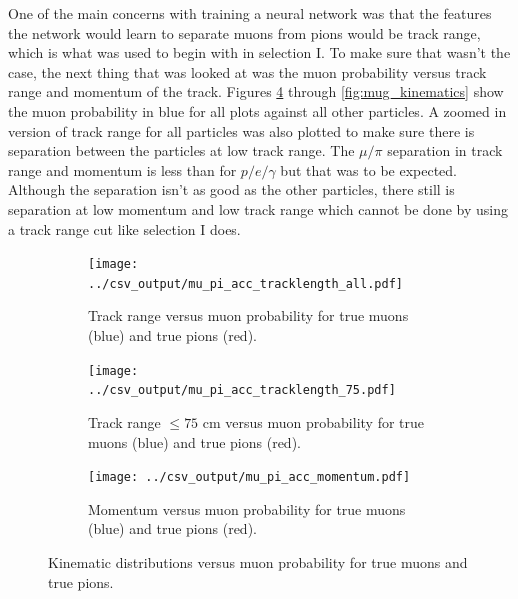 One of the main concerns with training a neural network was that the features the network would learn to separate muons from pions would be track range, which is what was used to begin with in selection I. To make sure that wasn't the case, the next thing that was looked at was the muon probability versus track range and momentum of the track. Figures \ref{fig:mupi_kinematics} through \ref{fig:mug_kinematics} show the muon probability in blue for all plots against all other particles. A zoomed in version of track range for all particles was also plotted to make sure there is separation between the particles at low track range. The $\mu/\pi$ separation in track range and momentum is less than for $p/e/\gamma$ but that was to be expected. Although the separation isn't as good as the other particles, there still is separation at low momentum and low track range which cannot be done by using a track range cut like selection I does.  
\begin{figure}[htp]
\centering
	\begin{subfigure}[t]{.475\textwidth}
		\centering
		\texttt{[image: ../csv\_output/mu\_pi\_acc\_tracklength\_all.pdf]}
		\caption{Track range versus muon probability for true muons (blue) and true pions (red).}
		\label{fig:mupi_tracklength}
	\end{subfigure}
	\begin{subfigure}[t]{.475\textwidth}
		\centering
		\texttt{[image: ../csv\_output/mu\_pi\_acc\_tracklength\_75.pdf]}
		\caption{Track range $\leq 75$ cm versus muon probability for true muons (blue) and true pions (red).}
		\label{fig:mupi_tracklength75}
	\end{subfigure}
	\begin{subfigure}[t]{.475\textwidth}
		\centering
		\texttt{[image: ../csv\_output/mu\_pi\_acc\_momentum.pdf]}
		\caption{Momentum versus muon probability for true muons (blue) and true pions (red).}
		\label{fig:mupi_momentum}
	\end{subfigure}
\caption{Kinematic distributions versus muon probability for true muons and true pions.}
\label{fig:mupi_kinematics}
\end{figure}

